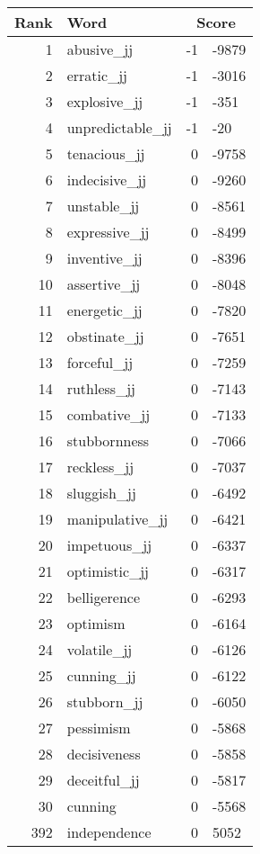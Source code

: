 \begin{longtable}[!htbp]{| rlr@{.}l |}
    \hline
    \textbf{Rank} & \textbf{Word} & \multicolumn{2}{c|}{\textbf{Score}} \\
    \hline
    \endhead
    1 & abusive\_jj & -1 & -9879 \\
    2 & erratic\_jj & -1 & -3016 \\
    3 & explosive\_jj & -1 & -351 \\
    4 & unpredictable\_jj & -1 & -20 \\
    5 & tenacious\_jj & 0 & -9758 \\
    6 & indecisive\_jj & 0 & -9260 \\
    7 & unstable\_jj & 0 & -8561 \\
    8 & expressive\_jj & 0 & -8499 \\
    9 & inventive\_jj & 0 & -8396 \\
    10 & assertive\_jj & 0 & -8048 \\
    11 & energetic\_jj & 0 & -7820 \\
    12 & obstinate\_jj & 0 & -7651 \\
    13 & forceful\_jj & 0 & -7259 \\
    14 & ruthless\_jj & 0 & -7143 \\
    15 & combative\_jj & 0 & -7133 \\
    16 & stubbornness & 0 & -7066 \\
    17 & reckless\_jj & 0 & -7037 \\
    18 & sluggish\_jj & 0 & -6492 \\
    19 & manipulative\_jj & 0 & -6421 \\
    20 & impetuous\_jj & 0 & -6337 \\
    21 & optimistic\_jj & 0 & -6317 \\
    22 & belligerence & 0 & -6293 \\
    23 & optimism & 0 & -6164 \\
    24 & volatile\_jj & 0 & -6126 \\
    25 & cunning\_jj & 0 & -6122 \\
    26 & stubborn\_jj & 0 & -6050 \\
    27 & pessimism & 0 & -5868 \\
    28 & decisiveness & 0 & -5858 \\
    29 & deceitful\_jj & 0 & -5817 \\
    30 & cunning & 0 & -5568 \\
    392 & independence & 0 & 5052 \\

\end{longtable}
